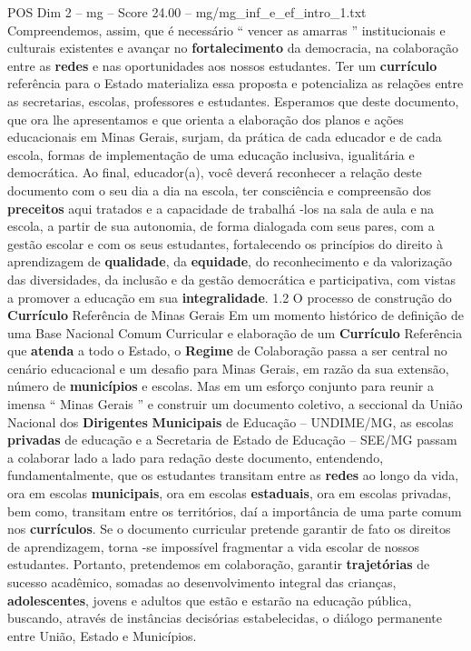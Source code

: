 \begin{textsample}{POS Dim 2 – mg – Score 24.00 – mg/mg\_inf\_e\_ef\_intro\_1.txt}
Compreendemos, assim, que é necessário “ vencer as amarras ” institucionais e culturais existentes e avançar no \textbf{fortalecimento} da democracia, na colaboração entre as \textbf{redes} e nas oportunidades aos nossos estudantes.
Ter um \textbf{currículo} referência para o Estado materializa essa proposta e potencializa as relações entre as secretarias, escolas, professores e estudantes.
Esperamos que deste documento, que ora lhe apresentamos e que orienta a elaboração dos planos e ações educacionais em Minas Gerais, surjam, da prática de cada educador e de cada escola, formas de implementação de uma educação inclusiva, igualitária e democrática.
Ao final, educador(a), você deverá reconhecer a relação deste documento com o seu dia a dia na escola, ter consciência e compreensão dos \textbf{preceitos} aqui tratados e a capacidade de trabalhá -los na sala de aula e na escola, a partir de sua autonomia, de forma dialogada com seus pares, com a gestão escolar e com os seus estudantes, fortalecendo os princípios do direito à aprendizagem de \textbf{qualidade}, da \textbf{equidade}, do reconhecimento e da valorização das diversidades, da inclusão e da gestão democrática e participativa, com vistas a promover a educação em sua \textbf{integralidade}. 1.2 O processo de construção do \textbf{Currículo} Referência de Minas Gerais Em um momento histórico de definição de uma Base Nacional Comum Curricular e elaboração de um \textbf{Currículo} Referência que \textbf{atenda} a todo o Estado, o \textbf{Regime} de Colaboração passa a ser central no cenário educacional e um desafio para Minas Gerais, em razão da sua extensão, número de \textbf{municípios} e escolas.
Mas em um esforço conjunto para reunir a imensa “ Minas Gerais ” e construir um documento coletivo, a seccional da União Nacional dos \textbf{Dirigentes} \textbf{Municipais} de Educação – UNDIME/MG, as escolas \textbf{privadas} de educação e a Secretaria de Estado de Educação – SEE/MG passam a colaborar lado a lado para redação deste documento, entendendo, fundamentalmente, que os estudantes transitam entre as \textbf{redes} ao longo da vida, ora em escolas \textbf{municipais}, ora em escolas \textbf{estaduais}, ora em escolas privadas, bem como, transitam entre os territórios, daí a importância de uma parte comum nos \textbf{currículos}.
Se o documento curricular pretende garantir de fato os direitos de aprendizagem, torna -se impossível fragmentar a vida escolar de nossos estudantes.
Portanto, pretendemos em colaboração, garantir \textbf{trajetórias} de sucesso acadêmico, somadas ao desenvolvimento integral das crianças, \textbf{adolescentes}, jovens e adultos que estão e estarão na educação pública, buscando, através de instâncias decisórias estabelecidas, o diálogo permanente entre União, Estado e Municípios.

\end{textsample}
